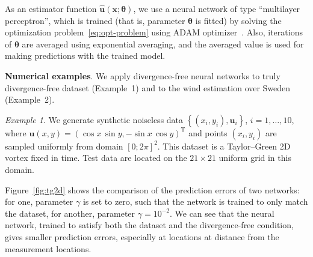 \documentclass[pamm,a4paper,fleqn]{w-art}
\newcommand{\T}{\ensuremath{\text{T}}}
\renewcommand{\vec}[1]{\boldsymbol{#1}}
\begin{document}
As an estimator function $\hat{\vec u}(\vec x; \vec\theta)$, we use a neural network
of type ``multilayer perceptron''\cite{GoodfellowEtAl2016}, which is trained
(that is, parameter $\vec\theta$ is fitted) by solving 
the optimization problem~\eqref{eq:opt-problem} using ADAM
optimizer~\cite{KingmaBa2014}.
Also, iterations of $\vec\theta$ are averaged using exponential
averaging, and the averaged value is used for making predictions with the
trained model.

\textbf{Numerical examples}.
We apply divergence-free neural networks to truly divergence-free dataset
(Example~1) and to the wind estimation over Sweden (Example~2).

\emph{Example 1}.
We generate synthetic noiseless data
  $\left\{(x_i, y_i), \vec{u}_i\right\}$, $i = 1, \dots, 10$,
where $\vec u(x, y) = ( \cos x \, \sin y, -\sin x \, \cos y)^\T$
and points $(x_i, y_i)$ are sampled uniformly from domain $[0; 2\pi]^2$.
This dataset is a Taylor--Green 2D vortex fixed in time.
Test data are located on the $21\times21$ uniform grid in this domain.

Figure~\ref{fig:tg2d} shows the comparison of the prediction errors of two
networks: for one, parameter $\gamma$ is set to zero, such that the network is
trained to only match the dataset, for another, parameter $\gamma = 10^{-2}$.
We can see that the neural network, trained to satisfy both the dataset and the
divergence-free condition, gives smaller prediction errors, especially at
locations at distance from the measurement locations.
\end{document}
